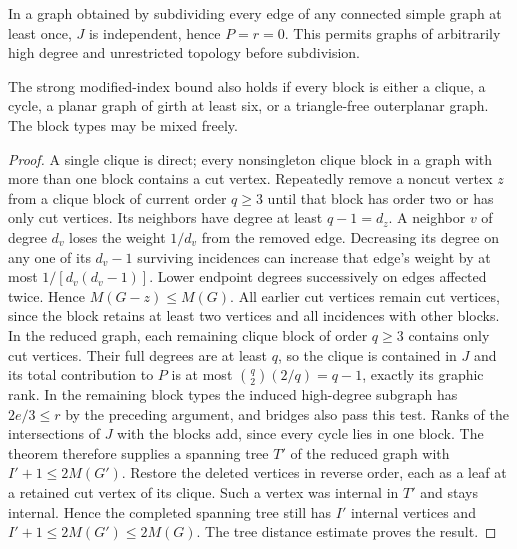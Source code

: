 \documentclass[11pt,a4paper]{article}
\begin{document}
In a graph obtained by subdividing every edge of any connected simple graph
at least once, $J$ is independent, hence $P=r=0$. This permits graphs of
arbitrarily high degree and unrestricted topology before subdivision.
\begin{corollary}
The strong modified-index bound also holds if every block is either a clique,
a cycle, a planar graph of girth at least six, or a triangle-free outerplanar
graph. The block types may be mixed freely.
\end{corollary}
\begin{proof}
A single clique is direct; every nonsingleton clique block in a graph
with more than one block contains a cut vertex. Repeatedly remove a noncut
vertex $z$ from a clique block of current order $q\ge3$ until that block
has order two or has only cut vertices. Its neighbors have degree at least
$q-1=d_z$. A neighbor $v$ of degree $d_v$ loses the weight $1/d_v$ from
the removed edge. Decreasing its degree on any one of its $d_v-1$ surviving
incidences can increase that edge's weight by at most $1/[d_v(d_v-1)]$.
Lower endpoint degrees successively on edges affected twice. Hence
$M(G-z)\le M(G)$. All earlier cut vertices remain cut vertices, since
the block retains at least two vertices and all incidences with other
blocks.
In the reduced graph, each remaining clique block of order $q\ge3$
contains only cut vertices. Their full degrees are at least $q$, so
the clique is contained in $J$ and its total contribution to $P$ is
at most $\binom q2(2/q)=q-1$, exactly its graphic rank.
In the remaining block types the induced high-degree subgraph has
$2e/3\le r$ by the preceding argument, and bridges also pass this test.
Ranks of the intersections of $J$ with the blocks add, since every cycle
lies in one block. The theorem therefore supplies a spanning tree $T'$
of the reduced graph with $I'+1\le2M(G')$. Restore the deleted vertices
in reverse order, each as a leaf at a retained cut vertex of its clique.
Such a vertex was internal in $T'$ and stays internal. Hence the
completed spanning tree still has $I'$ internal vertices and
$I'+1\le2M(G')\le2M(G)$. The tree distance estimate proves the result.
\end{proof}
\end{document}
